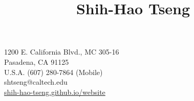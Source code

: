 \title{Shih-Hao Tseng}{
1200 E. California Blvd., MC 305-16\\
Pasadena, CA 91125\\%
U.S.A.
}{
(607) 280-7864 (Mobile)\\
shtseng@caltech.edu\\
\href{http://shih-hao-tseng.github.io/website}{shih-hao-tseng.github.io/website}%
}